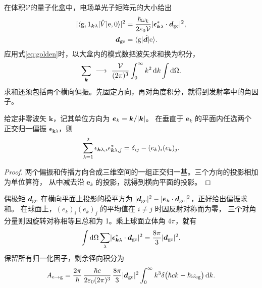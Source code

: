 在体积$\mathcal V$的量子化盒中，电场单光子矩阵元的大小给出
\begin{subequations}
    \begin{align}
        \lvert\langle\mathrm{g},1_{\bm k\lambda}\vert\hat{V}\vert\mathrm{e},0\rangle\rvert^2
          &= \frac{\hbar\omega_k}{2\varepsilon_0\mathcal V}
        \lvert\bm\epsilon_{\bm k\lambda}^\ast \cdot \bm d_{\mathrm{g}\mathrm{e}}\rvert^2,\\
        \bm d_{\mathrm{g}\mathrm{e}} &= \langle\mathrm{g}\vert\hat{\bm{d}}\vert\mathrm{e}\rangle.
    \end{align}
\end{subequations}
应用式\eqref{eq:golden}时，以大盒内的模式数把波矢求和换为积分，
\begin{equation}\label{eq:qm-photon-mode-density}
    \sum_{\bm k}\  \longrightarrow \ \frac{\mathcal V}{(2\pi)^3}
    \int_0^\infty k^2\mathop{}\!\mathrm{d} k\int \mathop{}\!\mathrm{d}\Omega .
\end{equation}
求和还须包括两个横向偏振。先固定方向，再对角度积分，就得到发射率中的角因子。
\begin{lemma}[两个横向偏振的求和]
    给定非零波矢 $\bm k$，记其单位方向为 $\bm e_k = \bm k/\lvert\bm k\rvert$。
    在垂直于 $\bm e_k$ 的平面内任选两个正交归一偏振 $\bm\epsilon_{\bm k\lambda}$，则
    \begin{equation}\label{eq:qm-transverse-polarization-sum}
        \sum_{\lambda=1}^2\epsilon_{\bm k\lambda,i}\epsilon_{\bm k\lambda,j}^\ast
        = \delta_{ij} - (e_k)_i(e_k)_j .
    \end{equation}
\end{lemma}
\begin{proof}
    两个偏振和传播方向合成三维空间的一组正交归一基。三个方向的投影相加为单位算符，
    从中减去沿 $\bm e_k$ 的投影，就得到横向平面的投影。
\end{proof}
偶极矩 $\bm d_{\mathrm{g}\mathrm{e}}$ 在横向平面上投影的模平方为 $\lvert\bm d_{\mathrm{g}\mathrm{e}}\rvert^2 - \lvert\bm e_k \cdot \bm d_{\mathrm{g}\mathrm{e}}\rvert^2$，正好给出偏振求和。
在球面上，$(e_k)_i(e_k)_j$ 的平均值在 $i \ne j$ 时因反射对称而为零，
三个对角分量则因旋转对称相等且总和为 1。乘上球面立体角 $4\pi$，就有
\begin{equation}
    \int\mathop{}\!\mathrm{d}\Omega\sum_\lambda\lvert\bm\epsilon_{\bm k\lambda}^\ast \cdot \bm d_{\mathrm{g}\mathrm{e}}\rvert^2
    = \frac{8\pi}{3}\lvert\bm d_{\mathrm{g}\mathrm{e}}\rvert^2.
\end{equation}
保留所有归一化因子，剩余径向积分为
\begin{equation}
    A_{\mathrm{e}\to\mathrm{g}} = \frac{2\pi}{\hbar}\,
        \frac{\hbar c}{2\varepsilon_0(2\pi)^3}\,
        \frac{8\pi}{3}\lvert\bm d_{\mathrm{g}\mathrm{e}}\rvert^2
        \int_0^\infty k^3\delta\bigl(\hbar ck - \hbar\omega_{\mathrm{e}\mathrm{g}}\bigr)\mathop{}\!\mathrm{d} k .
\end{equation}
